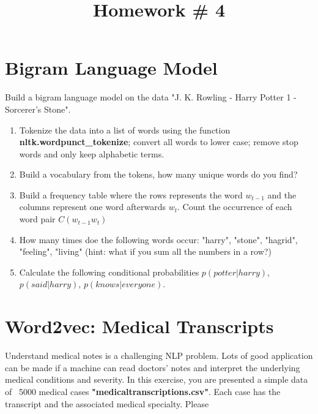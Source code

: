 \documentclass{article}
\title{Homework \#	4} %
\begin{document}
\maketitle %
\thispagestyle{fancy}
\pagestyle{fancy}%

\section{Bigram Language Model}
Build a bigram language model on the data "J. K. Rowling - Harry Potter 1 - Sorcerer's Stone". 
\begin{enumerate}[(1)]
\item Tokenize the data into a list of words using the function \textbf{nltk.wordpunct\_tokenize}; convert all words to lower case; remove stop words and only keep alphabetic terms.
\item Build a vocabulary from the tokens, how many unique words do you find?
\item Build a frequency table where the rows represents the word $w_{t-1}$ and the columns represent one word afterwards $w_{t}$. Count the occurrence of each word pair $C({w_{t-1} w_{t}})$
\item How many times doe the following words occur: "harry", "stone",  "hagrid", "feeling", "living" (hint: what if you sum all the numbers in a row?)
\item Calculate the following conditional probabilities $p(potter|harry)$, $p(said|harry)$, $p(knows|everyone)$.
\end{enumerate}


\section{Word2vec: Medical Transcripts} %
Understand medical notes is a challenging NLP problem. Lots of good application can be made if a machine can read doctors' notes and interpret the underlying medical conditions and severity. In this exercise, you are presented a simple data of ~5000 medical cases \textbf{"medicaltranscriptions.csv"}. Each case has the transcript and the associated medical specialty. Please 
\end{document}
